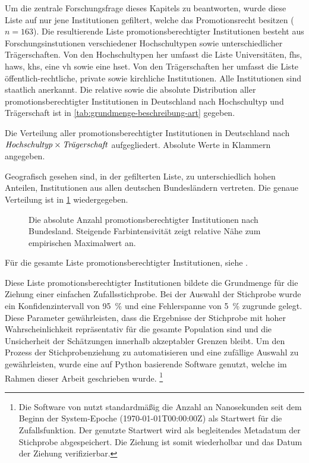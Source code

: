 Um die zentrale Forschungsfrage dieses Kapitels zu beantworten, wurde diese Liste auf nur jene Institutionen gefiltert, welche das Promotionsrecht besitzen ($n=163$).
Die resultierende Liste promotionsberechtigter Institutionen besteht aus Forschungsinstutionen verschiedener Hochschultypen sowie unterschiedlicher Trägerschaften.
Von den Hochschultypen her umfasst die Liste Universitäten, \glspl{fh}, \glspl{haw}, \glspl{kh}, eine \gls{vh} sowie eine \gls{hset}.
Von den Trägerschaften her umfasst die Liste öffentlich-rechtliche, private sowie kirchliche Institutionen. Alle Institutionen sind staatlich anerkannt.
Die relative sowie die absolute Distribution aller promotionsberechtigter Institutionen in Deutschland nach Hochschultyp und Trägerschaft ist in \cref{tab:grundmenge-beschreibung-art} gegeben.
\begin{table}[!htbp]
	\caption{Die Verteilung aller promotionsberechtigter Institutionen in Deutschland nach $\text{\textit{Hochschultyp}}\times\text{\textit{Trägerschaft}}$ aufgegliedert. Absolute Werte in Klammern angegeben.}
    
	\label{tab:grundmenge-beschreibung-art}
\end{table}

\noindent Geografisch gesehen sind, in der gefilterten Liste, zu unterschiedlich hohen Anteilen, Institutionen aus allen deutschen Bundesländern vertreten.
Die genaue Verteilung ist in \cref{fig:DE-grundmenge-beschreibung} wiedergegeben.
\begin{figure}[!htbp]
    \centering
    
    \caption{Die absolute Anzahl promotionsberechtigter Institutionen nach Bundesland.
    Steigende Farbintensivität zeigt relative Nähe zum empirischen Maximalwert an.}
    \label{fig:DE-grundmenge-beschreibung}
\end{figure}

\noindent Für die gesamte Liste promotionsberechtigter Institutionen, siehe \autocite{my-dataset}.

Diese Liste promotionsberechtigter Institutionen bildete die Grundmenge für die Ziehung einer einfachen Zufallsstichprobe.
Bei der Auswahl der Stichprobe wurde ein Konfidenzintervall von \SI{95}{\percent} und eine Fehlerspanne von \SI{5}{\percent} zugrunde gelegt.
Diese Parameter gewährleisten, dass die Ergebnisse der Stichprobe mit hoher Wahrscheinlichkeit repräsentativ für die gesamte Population sind und die Unsicherheit der Schätzungen innerhalb akzeptabler Grenzen bleibt.
Um den Prozess der Stichprobenziehung zu automatisieren und eine zufällige Auswahl zu gewährleisten, wurde eine auf Python basierende Software \autocite{Krassnig2024-csv} genutzt, welche im Rahmen dieser Arbeit geschrieben wurde.%
\footnote{%
Die Software von \citeauthor{Krassnig2024-csv} \autocite{Krassnig2024-csv} nutzt standardmäßig die Anzahl an Nanosekunden seit dem Beginn der System-Epoche (1970-01-01T00:00:00Z) als Startwert für die Zufallsfunktion.
Der genutzte Startwert wird als begleitendes Metadatum der Stichprobe abgespeichert.
Die Ziehung ist somit wiederholbar und das Datum der Ziehung verifizierbar.} 

